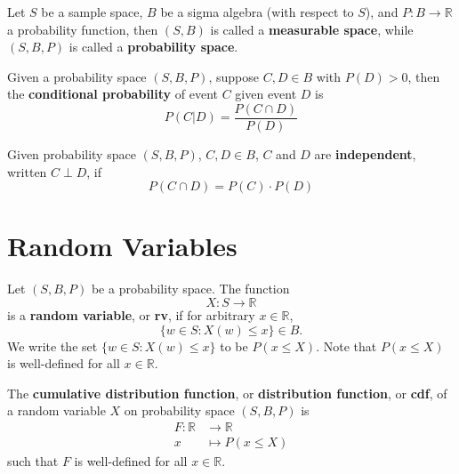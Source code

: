 \documentclass[11pt,fleqn]{book} %
\begin{document}
\begin{definition} 
Let \(S\) be a sample space, \(B\) be a sigma algebra (with respect to \(S\)), and \(P:B \rightarrow\mathbb{R}\) a probability function, then \((S, B)\) is called a \textbf{measurable space}, while \((S, B, P)\) is called a \textbf{probability space}.
\end{definition}

\begin{definition} 
Given a probability space \((S, B, P)\), suppose \(C, D \in B\) with \(P(D) > 0\), then the \textbf{conditional probability} of event \(C\) given event \(D\) is
\[
P(C | D) = \frac{P(C \cap D)}{P(D)}
\]
\end{definition}

\begin{definition} 
Given probability space \((S, B, P)\), \(C, D \in B\), \(C\) and \(D\) are \textbf{independent}, written \(C \perp D\), if
\[
P(C \cap D) = P(C)\cdot P(D)
\]
\end{definition}


\section{Random Variables}

\begin{definition} 
Let \((S, B, P)\) be a probability space. The function 
\[
X: S \rightarrow \mathbb{R}
\]
is a \textbf{random variable}, or \textbf{rv}, if for arbitrary \(x \in \mathbb{R}\), 
\[
\{w \in S: X(w) \leq x\} \in B.
\]
We write the set \(\{w \in S: X(w) \leq x\}\) to be \(P(x \leq X)\). Note that \(P(x \leq X)\) is well-defined for all \(x \in \mathbb{R}\).
\end{definition}

\begin{definition}
The \textbf{cumulative distribution function}, or \textbf{distribution function}, or \textbf{cdf}, of a random variable \(X\) on probability space \((S, B, P)\) is
\[
\begin{aligned}
F: \mathbb{R} &\rightarrow \mathbb{R} \\
x &\mapsto P(x \leq X)
\end{aligned}
\]
such that \(F\) is well-defined for all \(x \in \mathbb{R}\).
\end{definition}
\end{document}

